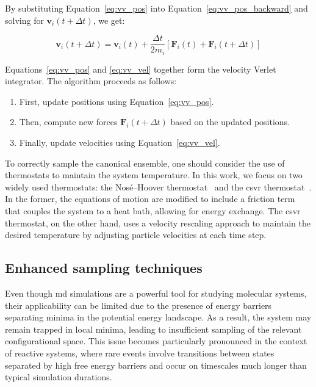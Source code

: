 By substituting Equation~\ref{eq:vv_pos} into Equation~\ref{eq:vv_pos_backward} and solving for $\mathbf{v}_i(t + \Delta t)$, we get:

\begin{equation}
    \mathbf{v}_i(t + \Delta t) = \mathbf{v}_i(t) + \frac{\Delta t}{2m_i} \left[ \mathbf{F}_i(t) + \mathbf{F}_i(t + \Delta t) \right]
    \label{eq:vv_vel}
\end{equation}

Equations~\ref{eq:vv_pos} and \ref{eq:vv_vel} together form the velocity Verlet integrator. The algorithm proceeds as follows:
\begin{enumerate}
  \item First, update positions using Equation~\ref{eq:vv_pos}.
  \item Then, compute new forces $\mathbf{F}_i(t + \Delta t)$ based on the updated positions.
  \item Finally, update velocities using Equation~\ref{eq:vv_vel}.
\end{enumerate}

To correctly sample the canonical ensemble, one should consider the use of thermostats to maintain the system temperature. In this work, we focus on two widely used thermostats: the Nos\'e--Hoover thermostat~\citep{noseUnifiedFormulationConstant1984, hooverCanonicalDynamicsEquilibrium1985} and the \ac{csvr} thermostat~\citep{bussiCanonicalSamplingVelocity2007}. In the former, the equations of motion are modified to include a friction term that couples the system to a heat bath, allowing for energy exchange. The \ac{csvr} thermostat, on the other hand, uses a velocity rescaling approach to maintain the desired temperature by adjusting particle velocities at each time step.



\subsection{Enhanced sampling techniques}
Even though \ac{md} simulations are a powerful tool for studying molecular systems, their applicability can be limited due to the presence of energy barriers separating minima in the potential energy landscape. As a result, the system may remain trapped in local minima, leading to insufficient sampling of the relevant configurational space. This issue becomes particularly pronounced in the context of reactive systems, where rare events involve transitions between states separated by high free energy barriers and occur on timescales much longer than typical simulation durations.

